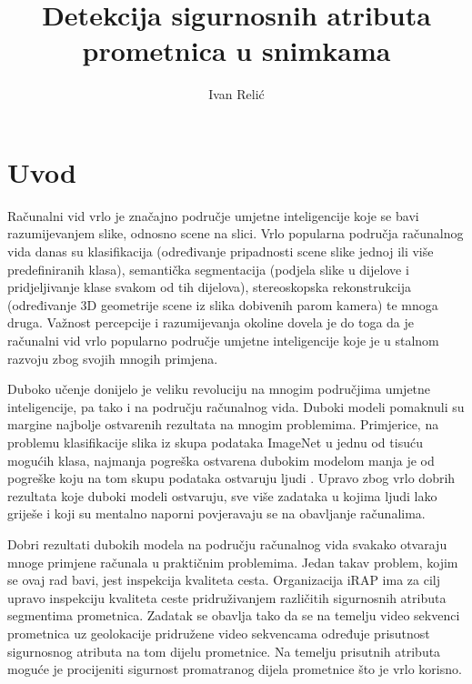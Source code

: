 \documentclass[times, utf8, diplomski, numeric]{fer}
\begin{document}
\nocite{*}


\title{Detekcija sigurnosnih atributa prometnica u snimkama}

\author{Ivan Relić}

\maketitle

\izvornik

\zahvala{}

\tableofcontents

\chapter{Uvod}
Računalni vid vrlo je značajno područje umjetne inteligencije koje se bavi razumijevanjem slike, odnosno scene na slici. 
Vrlo popularna područja računalnog vida danas su klasifikacija (određivanje pripadnosti scene slike jednoj ili više predefiniranih klasa), semantička segmentacija (podjela slike u dijelove i pridjeljivanje klase svakom od tih dijelova), stereoskopska rekonstrukcija (određivanje 3D geometrije scene iz slika dobivenih parom kamera) te mnoga druga.
Važnost percepcije i razumijevanja okoline dovela je do toga da je računalni vid vrlo popularno područje umjetne inteligencije koje je u stalnom razvoju zbog svojih mnogih primjena.

Duboko učenje donijelo je veliku revoluciju na mnogim područjima umjetne inteligencije, pa tako i na području računalnog vida. 
Duboki modeli pomaknuli su margine najbolje ostvarenih rezultata na mnogim problemima. 
Primjerice,  na problemu klasifikacije slika iz skupa podataka ImageNet \citep{dataset:imagenet} u jednu od tisuću mogućih klasa, najmanja pogreška ostvarena dubokim modelom manja je od pogreške koju na tom skupu podataka ostvaruju ljudi \citep{article:delving_deep_into_rectifiers}. 
Upravo zbog vrlo dobrih rezultata koje duboki modeli ostvaruju, sve više zadataka u kojima ljudi lako griješe i koji su mentalno naporni povjeravaju se na obavljanje računalima.

Dobri rezultati dubokih modela na području računalnog vida svakako otvaraju mnoge primjene računala u praktičnim problemima. 
Jedan takav problem, kojim se ovaj rad bavi, jest inspekcija kvaliteta cesta. 
Organizacija iRAP  ima za cilj upravo inspekciju kvaliteta ceste pridruživanjem različitih sigurnosnih atributa segmentima prometnica.
Zadatak se obavlja tako da se na temelju video sekvenci prometnica uz geolokacije pridružene video sekvencama određuje prisutnost sigurnosnog atributa na tom dijelu prometnice.
Na temelju prisutnih atributa moguće je procijeniti sigurnost promatranog dijela prometnice što je vrlo korisno.
\end{document}

